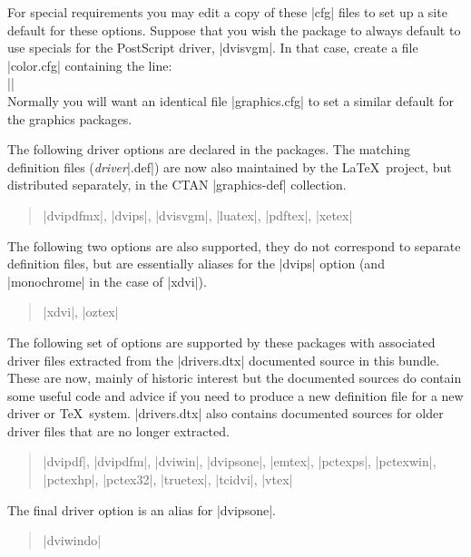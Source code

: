 For special requirements you may edit a copy of these |cfg| files
to set up a site default for these options. Suppose that you wish
the  package to always default to use specials for the
PostScript driver, |dvisvgm|. In that case, create a file |color.cfg|
containing the line:\\
||\\
Normally you will want an identical file |graphics.cfg| to set a similar
default for the graphics packages.

The following driver options are declared in the packages.
The matching definition files (\emph{driver}|.def|)
are now also maintained by the \LaTeX\ project,
but distributed separately, in the CTAN |graphics-def| collection.
\begin{quote}\raggedright
  |dvipdfmx|, |dvips|, |dvisvgm|, |luatex|, |pdftex|, |xetex|
\end{quote}


The following two options are also supported, they do not correspond
to separate definition files, but are essentially aliases for the
|dvips| option (and |monochrome| in the case of |xdvi|).
\begin{quote}\raggedright
 |xdvi|,  |oztex|
\end{quote}

The following set of options are supported by these packages
with associated driver files extracted from the |drivers.dtx|
documented source in this bundle. These are now, mainly of historic
interest but the documented sources do contain some useful code
and advice if you need to produce a new definition file for a new
driver or \TeX\ system. |drivers.dtx| also contains documented
sources for older driver files that are no longer extracted.
\begin{quote}\raggedright
 |dvipdf|, |dvipdfm|, |dviwin|, |dvipsone|,
 |emtex|, |pctexps|, |pctexwin|,  |pctexhp|, |pctex32|,
 |truetex|, |tcidvi|, |vtex|
\end{quote}

The final driver option is an alias for |dvipsone|.
\begin{quote}\raggedright
  |dviwindo|
\end{quote}
  

